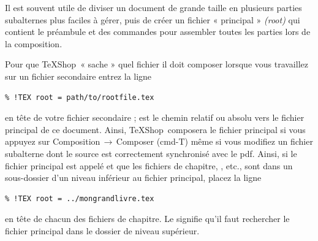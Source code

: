 \documentclass[11pt,french]{article}
\newcommand{\TS}{\textsf{\TeX Shop}}
\newcommand{\acr}[1]{\textsf{#1}}
\newcommand{\cmd}[1]{\textsf{#1}}
\newcommand{\mnu}[1]{\textsf{#1}}
\newcommand{\To}{\,\(\to\)\,}
\begin{document}
Il est souvent utile de diviser un document de grande taille en plusieurs parties subalternes plus faciles à gérer, puis de créer un fichier « principal » \emph{(root)} qui contient le préambule et des commandes \verb|| pour assembler toutes les parties lors de la composition.

Pour que \TS\ « sache » quel fichier il doit composer lorsque vous travaillez sur un fichier secondaire entrez la ligne \begin{verbatim}
% !TEX root = path/to/rootfile.tex
\end{verbatim}
en tête de votre fichier secondaire ;  est le chemin relatif ou absolu vers le fichier principal de ce document. Ainsi, \TS\ composera le fichier principal si vous appuyez sur \mnu{Composition}\To\mnu{Composer} (\cmd{cmd-T}) même si vous modifiez un fichier subalterne dont le source est correctement synchronisé avec le \acr{pdf}. Ainsi, si le fichier principal est appelé  et que les fichiers de chapitre, , etc., sont dans un sous-dossier  d'un niveau inférieur au fichier principal, placez la ligne
\begin{verbatim}
% !TEX root = ../mongrandlivre.tex
\end{verbatim}
en tête de chacun des fichiers de chapitre. Le  signifie qu'il faut rechercher le fichier principal dans le dossier de niveau supérieur.

%
\end{document}
